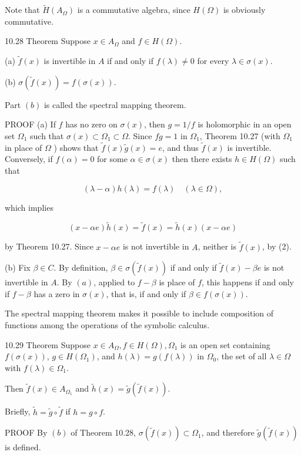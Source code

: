 \documentclass[10pt]{article}
\begin{document}
Note that $\widetilde{H}\left(A_{\Omega}\right)$ is a commutative algebra, since $H(\Omega)$ is obviously commutative.

10.28 Theorem Suppose $x \in A_{\Omega}$ and $f \in H(\Omega)$.

(a) $\tilde{f}(x)$ is invertible in $A$ if and only if $f(\lambda) \neq 0$ for every $\lambda \in \sigma(x)$.

(b) $\sigma(\tilde{f}(x))=f(\sigma(x))$.

Part $(b)$ is called the spectral mapping theorem.

PROOF (a) If $f$ has no zero on $\sigma(x)$, then $g=1 / f$ is holomorphic in an open set $\Omega_{1}$ such that $\sigma(x) \subset \Omega_{1} \subset \Omega$. Since $f g=1$ in $\Omega_{1}$, Theorem 10.27 (with $\Omega_{1}$ in place of $\Omega$ ) shows that $\tilde{f}(x) \tilde{g}(x)=e$, and thus $\tilde{f}(x)$ is invertible. Conversely, if $f(\alpha)=0$ for some $\alpha \in \sigma(x)$ then there exists $h \in H(\Omega)$ such that

$$
(\lambda-\alpha) h(\lambda)=f(\lambda) \quad(\lambda \in \Omega),
$$

which implies

$$
(x-\alpha e) \tilde{h}(x)=\tilde{f}(x)=\tilde{h}(x)(x-\alpha e)
$$

by Theorem 10.27. Since $x-\alpha e$ is not invertible in $A$, neither is $\tilde{f}(x)$, by (2).

(b) Fix $\beta \in C$. By definition, $\beta \in \sigma(\tilde{f}(x))$ if and only if $\tilde{f}(x)-\beta e$ is not invertible in $A$. By $(a)$, applied to $f-\beta$ is place of $f$, this happens if and only if $f-\beta$ has a zero in $\sigma(x)$, that is, if and only if $\beta \in f(\sigma(x))$.

The spectral mapping theorem makes it possible to include composition of functions among the operations of the symbolic calculus.

10.29 Theorem Suppose $x \in A_{\Omega}, f \in H(\Omega), \Omega_{1}$ is an open set containing $f(\sigma(x))$, $g \in H\left(\Omega_{1}\right)$, and $h(\lambda)=g(f(\lambda))$ in $\Omega_{0}$, the set of all $\lambda \in \Omega$ with $f(\lambda) \in \Omega_{1}$.

Then $\tilde{f}(x) \in A_{\Omega_{1}}$ and $\tilde{h}(x)=\tilde{g}(\tilde{f}(x))$.

Briefly, $\tilde{h}=\tilde{g} \circ \tilde{f}$ if $h=g \circ f$.

PROOF By $(b)$ of Theorem 10.28, $\sigma(\tilde{f}(x)) \subset \Omega_{1}$, and therefore $\tilde{g}(\tilde{f}(x))$ is defined.
\end{document}
